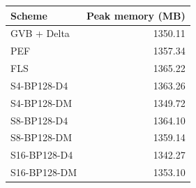 \begin{tabular}{lr}
\toprule
Scheme & Peak memory (MB) \\
\midrule
GVB + Delta & 1350.11 \\
PEF & 1357.34 \\
FLS & 1365.22 \\
S4-BP128-D4 & 1363.26 \\
S4-BP128-DM & 1349.72 \\
S8-BP128-D4 & 1364.10 \\
S8-BP128-DM & 1359.14 \\
S16-BP128-D4 & 1342.27 \\
S16-BP128-DM & 1353.10 \\
\bottomrule
\end{tabular}
